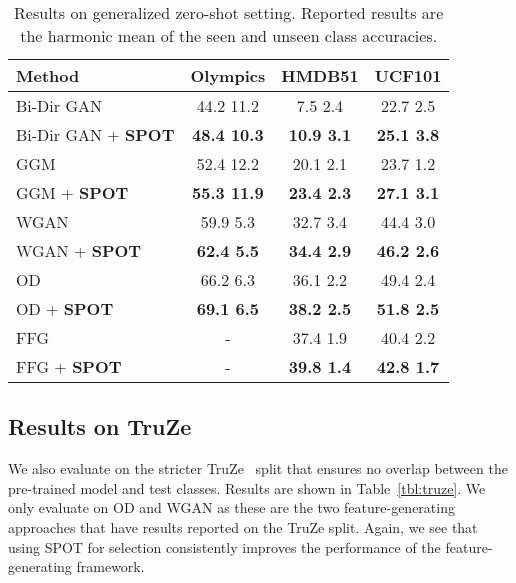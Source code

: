 \documentclass[10pt,twocolumn,letterpaper]{article}
\begin{document}
\setlength{\tabcolsep}{2pt}
\begin{table}
\small
\begin{center}
\begin{tabular}{|l|c|c|c|}
\hline
Method & Olympics & HMDB51 & UCF101\\
\hline\hline
Bi-Dir GAN \cite{syn} & 44.2  11.2 & 7.5  2.4 &	22.7  2.5\\
Bi-Dir GAN \cite{syn} + \textbf{SPOT} & \textbf{48.4  10.3} & \textbf{10.9  3.1} &	\textbf{25.1  3.8}\\
\hline

GGM \cite{GGM2018} & 52.4  12.2  & 20.1  2.1 & 23.7  1.2 \\
GGM \cite{GGM2018} + \textbf{SPOT} & \textbf{55.3  11.9} & \textbf{23.4  2.3} & \textbf{27.1  3.1} \\
\hline

WGAN \cite{clswgan} & 59.9  5.3 & 32.7  3.4 & 44.4  3.0 \\
WGAN \cite{clswgan} + \textbf{SPOT} & \textbf{62.4  5.5} & \textbf{34.4  2.9} & \textbf{46.2  2.6} \\
\hline

OD\cite{OD}  & 66.2  6.3 & 36.1  2.2 & 49.4  2.4\\
OD \cite{OD} + \textbf{SPOT} & \textbf{69.1  6.5} & \textbf{38.2  2.5} & \textbf{51.8  2.5}\\
\hline

FFG \cite{finegrain} & - & 37.4  1.9 & 40.4  2.2 \\
FFG \cite{finegrain} + \textbf{SPOT} & - & \textbf{39.8  1.4} & \textbf{42.8  1.7} \\

\hline
\end{tabular}
\end{center}
\caption{Results on generalized zero-shot setting. Reported results are the harmonic mean of the seen and unseen class accuracies. 
}
\label{tbl:results:gzsl}
\end{table}

\subsection{Results on TruZe}

We also evaluate on the stricter TruZe~\cite{truze} split that ensures no overlap between the pre-trained model and test classes. Results are shown in Table~\ref{tbl:truze}. We only evaluate on OD and WGAN as these are the two feature-generating approaches that have results reported on the TruZe split. Again, we see that using SPOT for selection consistently improves the performance of the feature-generating framework.
\end{document}

